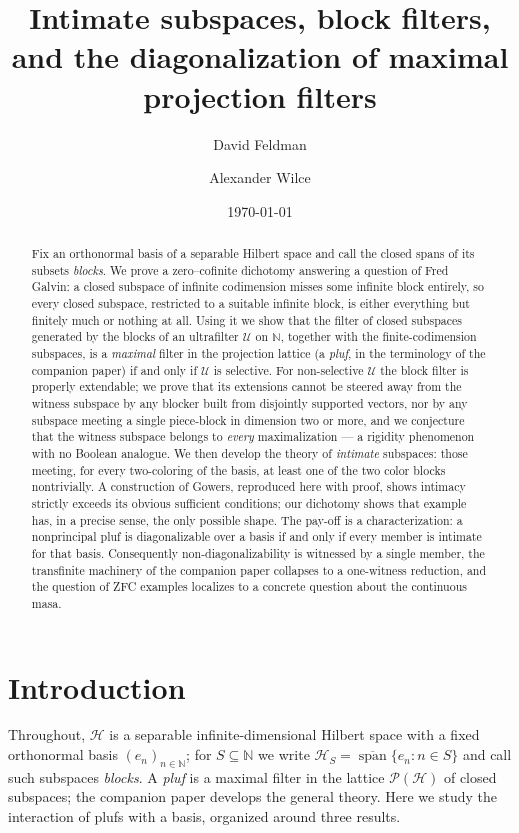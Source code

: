 \documentclass[11pt,reqno]{amsart}
\title[Intimate subspaces and block filters]
{Intimate subspaces, block filters,\\ and the diagonalization of maximal projection
filters}
\author{David Feldman}
\author{Alexander Wilce}
\date{\today}
\theoremstyle{definition}
\newcommand{\HH}{\mathcal{H}}
\newcommand{\PP}{\mathcal{P}}
\newcommand{\N}{\mathbb{N}}
\newcommand{\U}{\mathcal{U}}
\begin{document}
\begin{abstract}
Fix an orthonormal basis of a separable Hilbert space and call the closed spans of its
subsets \emph{blocks}. We prove a zero--cofinite dichotomy answering a question of Fred
Galvin: a closed subspace of infinite codimension misses some infinite block entirely,
so every closed subspace, restricted to a suitable infinite block, is either everything
but finitely much or nothing at all. Using it we show that the filter of closed subspaces
generated by the blocks of an ultrafilter $\U$ on $\N$, together with the
finite-codimension subspaces, is a \emph{maximal} filter in the projection lattice
(a \emph{pluf}, in the terminology of the companion paper) if and only if $\U$ is
selective. For non-selective $\U$ the block filter is properly extendable; we prove
that its extensions cannot be steered away from the witness subspace by any blocker
built from disjointly supported vectors, nor by any subspace meeting a single
piece-block in dimension two or more, and we conjecture that the witness subspace
belongs to \emph{every} maximalization --- a rigidity phenomenon with no Boolean
analogue. We then
develop the theory of \emph{intimate} subspaces: those meeting, for every two-coloring
of the basis, at least one of the two color blocks nontrivially. A construction of
Gowers, reproduced here with proof, shows intimacy strictly exceeds its obvious
sufficient conditions; our dichotomy shows that example has, in a precise sense, the
only possible shape. The pay-off is a characterization: a nonprincipal pluf is
diagonalizable over a basis if and only if every member is intimate for that basis.
Consequently non-diagonalizability is witnessed by a single member, the transfinite
machinery of the companion paper collapses to a one-witness reduction, and the question
of ZFC examples localizes to a concrete question about the continuous masa.
\end{abstract}

\maketitle

\section{Introduction}\label{sec:intro}

Throughout, $\HH$ is a separable infinite-dimensional Hilbert space with a fixed
orthonormal basis $(e_n)_{n\in\N}$; for $S\subseteq\N$ we write
$\HH_S=\overline{\operatorname{span}}\{e_n:n\in S\}$ and call such subspaces
\emph{blocks}. A \emph{pluf} is a maximal filter in the lattice $\PP(\HH)$ of closed
subspaces; the companion paper \cite{FWI} develops the general theory. Here we study the
interaction of plufs with a basis, organized around three results.
\end{document}
